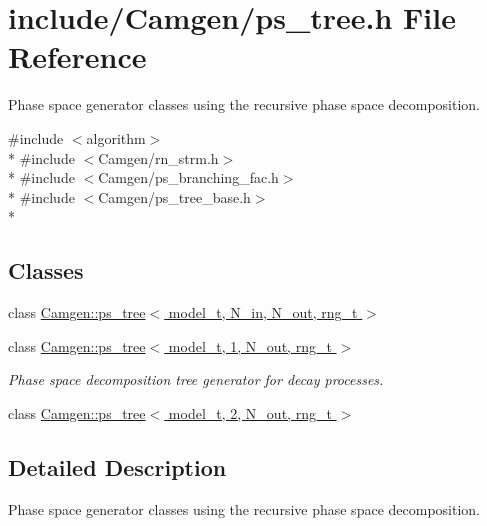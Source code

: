 \hypertarget{a00744}{}\section{include/\+Camgen/ps\+\_\+tree.h File Reference}
\label{a00744}


Phase space generator classes using the recursive phase space decomposition.  


{\ttfamily \#include $<$algorithm$>$}\\*
{\ttfamily \#include $<$Camgen/rn\+\_\+strm.\+h$>$}\\*
{\ttfamily \#include $<$Camgen/ps\+\_\+branching\+\_\+fac.\+h$>$}\\*
{\ttfamily \#include $<$Camgen/ps\+\_\+tree\+\_\+base.\+h$>$}\\*
\subsection*{Classes}
\begin{DoxyCompactItemize}
\item 
class \hyperlink{a00455}{Camgen\+::ps\+\_\+tree$<$ model\+\_\+t, N\+\_\+in, N\+\_\+out, rng\+\_\+t $>$}
\item 
class \hyperlink{a00456}{Camgen\+::ps\+\_\+tree$<$ model\+\_\+t, 1, N\+\_\+out, rng\+\_\+t $>$}
\begin{DoxyCompactList}\small\item\em Phase space decomposition tree generator for decay processes. \end{DoxyCompactList}\item 
class \hyperlink{a00457}{Camgen\+::ps\+\_\+tree$<$ model\+\_\+t, 2, N\+\_\+out, rng\+\_\+t $>$}
\end{DoxyCompactItemize}


\subsection{Detailed Description}
Phase space generator classes using the recursive phase space decomposition. 

